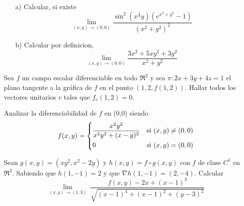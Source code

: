 
\begin{question}

\vspace{1em} %

\begin{itemize}
    \item[a)] Calcular, si existe
    \[
        \lim_{(x,y)\to(0,0)} \frac{\sin^2{(x^{\frac{1}{3}}y)}(e^{x^2+y^2}-1)}{(x^2+y^2)^2}
    \]
     \item[b)] Calcular por definicion,
     \[
        \lim_{(x,y)\to(0,0)} \frac{3x^2+5xy^2+3y^2}{x^2+y^2}
    \]
\end{itemize}



\end{question}

\begin{question}
    Sea $f$ un campo escalar diferenciable en todo $\Re^2$ y sea $\pi:2x+3y+4z=1$ el plano tangente a la gráfica de $f$ en el punto $(1,2,f(1,2))$. Hallar todos los vectores unitarios $v$ tales que $f_v(1,2)=0.$
\end{question}
\begin{question}
    Analizar la diferenciabilidad de $f$ en (0,0) siendo
      \[
        f(x,y) =
        \begin{dcases}
            \frac{x^2y^2}{x^2y^2+(x-y)^2} & \textnormal{si}\ (x,y) \neq (0,0) \\
            0                         & \textnormal{si}\ (x,y) = (0,0)
        \end{dcases}
    \]
\end{question}
\begin{question}
    Sean $g(x,y)=(xy^2,x^2-2y)$ y $h(x,y)=f \circ g(x,y)$ con $f$ de clase $C^1$ en $\Re^2$. Sabiendo que $h(1,-1)=2$ y que $\nabla h(1,-1)=(2,-4)$. Calcular
    \[
        \lim_{(x,y)\to (1,3)} \ 
        \frac{f(x,y)-2x+(x-1)^3}{\sqrt{(x-1)^4+(x-1)^2+(y-3)^2}}       
    \]
\end{question}
\newpage

